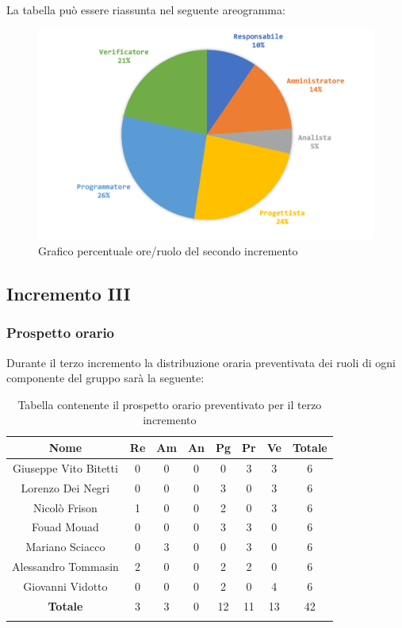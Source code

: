 		La tabella può essere riassunta nel seguente areogramma:
		\begin{figure}[H]
			\centering
			\includegraphics[width=0.8\linewidth]{./images/preventivo/incremento2-2.png}
			\caption{Grafico percentuale ore/ruolo del secondo incremento}
			\label{fig:grafico costi ruolo incremento II}
		\end{figure}


		
	\subsection{Incremento III}
		\subsubsection{Prospetto orario}
		Durante il terzo incremento la distribuzione oraria preventivata dei ruoli di ogni componente del gruppo sarà la seguente:
		
		\begin{longtable}{|c|c|c|c|c|c|c|c|}
			\hline
			\rowcolor{lighter-grayer}
			\textbf{Nome} & \textbf{Re} & \textbf{Am} & \textbf{An} & \textbf{Pg}  & \textbf{Pr}   & \textbf{Ve} & \textbf{Totale} \\
			\hline
			\endfirsthead
			
			\hline
			Giuseppe Vito Bitetti 		 & 0 & 0 & 0 & 0 & 3 & 3 & 6\\
			\hline
			\hline
			Lorenzo Dei Negri			 & 0 & 0 & 0 & 3 & 0 & 3 & 6\\
			\hline
			\hline
			Nicolò Frison				    & 1 & 0 & 0 & 2 & 0 & 3 & 6\\
			\hline
			\hline
			Fouad Mouad 				 & 0 & 0 & 0 & 3 & 3 & 0 & 6\\
			\hline
			\hline
			Mariano Sciacco 			 & 0 & 3 & 0 & 0 & 3 & 0 & 6\\
			\hline
			\hline
			Alessandro Tommasin     & 2 & 0 & 0 & 2 & 2 & 0 & 6\\
			\hline
			\hline
			Giovanni Vidotto 			 & 0 & 0 & 0 & 2 & 0 & 4 & 6\\
			\hline 
			\textbf{Totale}			 		& 3 & 3 & 0 & 12 & 11 & 13 & 42\\
			\hline
			\caption{Tabella contenente il prospetto orario preventivato per il terzo incremento}
		\end{longtable}
		\pagebreak
		
